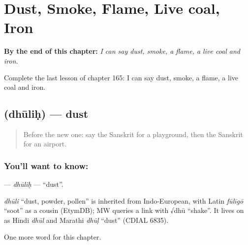 
\chapter{Dust, Smoke, Flame, Live coal, Iron}
\label{ch:sa-dust-smoke-flame-live-coal-iron}

\begin{chapteropening}
\textbf{By the end of this chapter:} \emph{I can say dust, smoke, a flame, a live coal and iron.}

Complete the last lesson of chapter 165: I can say dust, smoke, a flame, a live coal and iron.
\end{chapteropening}

\section[\texorpdfstring{\sk{धूलिः} (dhūliḥ)}{धूलिः (dhūliḥ)}]{ (dhūliḥ) — dust}

\label{lesson:SA-C165-dhulih}



\begin{quote}
Before the new one: say the Sanskrit for a playground, then the Sanskrit for an airport.
\end{quote}

\subsection*{You'll want to know: }
\textbf{} — \emph{dhūliḥ} — \textquotedblleft{}dust\textquotedblright{}.

\begin{cousinweb}
\emph{dhūli} \textquotedblleft{}dust, powder, pollen\textquotedblright{} is inherited from Indo-European, with Latin \emph{fūlīgō} \textquotedblleft{}soot\textquotedblright{} as a cousin (EtymDB); MW queries a link with √dhū \textquotedblleft{}shake\textquotedblright{}. It lives on as Hindi \emph{dhūl} and Marathi \emph{dhūḷ} \textquotedblleft{}dust\textquotedblright{} (CDIAL 6835).
\end{cousinweb}

\begin{grammarlens}[title={What you've built}]
One more word for this chapter.
\end{grammarlens}

